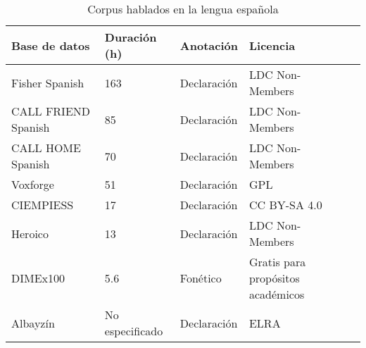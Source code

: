 \begin{table}[H]
\centering
\caption{Corpus hablados en la lengua española}
\label{tab:spanish_corpora}
\begin{tabular}{|l|l|l|l|l|}
\textbf{Base de datos} & \textbf{Duración (h)}  & \textbf{Anotación} & Licencia\\
\hline
Fisher Spanish \cite{FischerSpa}  & 163  & Declaración  & LDC Non-Members\\
\hline
CALL FRIEND Spanish \cite{CALLFRIENDSpa}  & 85  & Declaración & LDC Non-Members\\
\hline
CALL HOME Spanish \cite{CALLHOMESpa}  & 70  & Declaración & LDC Non-Members\\
\hline
Voxforge \cite{Voxforge.org}  & 51 & Declaración & GPL\\
\hline
CIEMPIESS\cite{Hernandez-MenaCIEMPIESS:Corpus}  & 17  & Declaración & CC BY-SA 4.0\\
\hline
Heroico \cite{HeroicoCorpus}  & 13 & Declaración & LDC Non-Members  \\
\hline
DIMEx100\cite{Pineda2004DIMEx100:Spanish}  & 5.6  & Fonético & \multicolumn{1}{|p{4cm}|}{Gratis para propósitos académicos}\\
\hline
Albayzín\cite{CampilloAlbayzinEvaluation}  & No especificado  & Declaración & ELRA\\
\hline
\end{tabular}
\end{table}